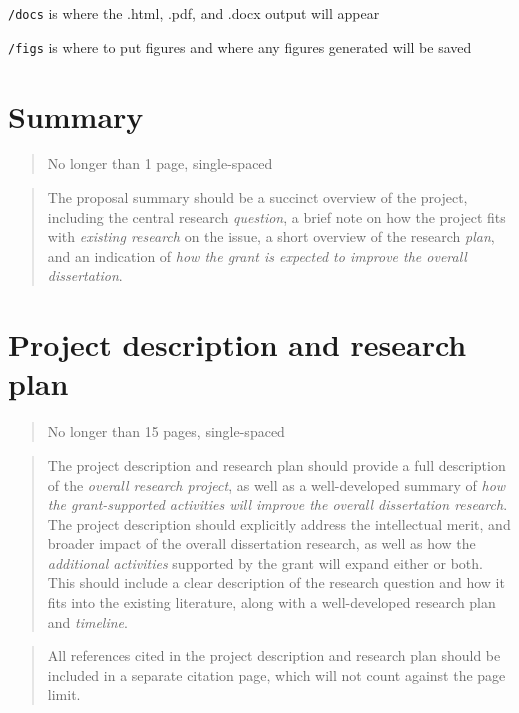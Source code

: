 \documentclass[
      12pt,
        ]{article}
\begin{document}
\texttt{/docs} is where the .html, .pdf, and .docx output will appear

\texttt{/figs} is where to put figures and where any figures generated will be saved

\newpage

\hypertarget{summary}{%
\section{Summary}\label{summary}}

\begin{quote}
No longer than 1 page, single-spaced
\end{quote}

\begin{quote}
The proposal summary should be a succinct overview of the project, including the central research \emph{question}, a brief note on how the project fits with \emph{existing research} on the issue, a short overview of the research \emph{plan}, and an indication of \emph{how the grant is expected to improve the overall dissertation}.
\end{quote}

\newpage

\hypertarget{project-description-and-research-plan}{%
\section{Project description and research plan}\label{project-description-and-research-plan}}

\begin{quote}
No longer than 15 pages, single-spaced
\end{quote}

\begin{quote}
The project description and research plan should provide a full description of the \emph{overall research project}, as well as a well-developed summary of \emph{how the grant-supported activities will improve the overall dissertation research}. The project description should explicitly address the intellectual merit, and broader impact of the overall dissertation research, as well as how the \emph{additional activities} supported by the grant will expand either or both. This should include a clear description of the research question and how it fits into the existing literature, along with a well-developed research plan and \emph{timeline}.
\end{quote}

\begin{quote}
All references cited in the project description and research plan should be included in a separate citation page, which will not count against the page limit.
\end{quote}
\end{document}
